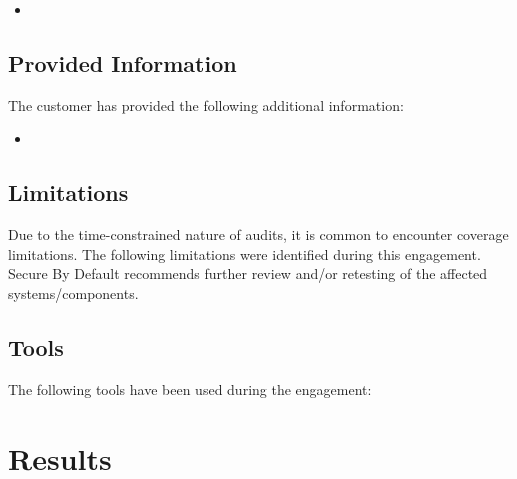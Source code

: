   \begin{itemize}
      \item {}
  \end{itemize}

  \subsection{Provided Information}

  The customer has provided the following additional information:

  \begin{itemize}
      \item {}
  \end{itemize}

  \subsection{Limitations}

  Due to the time-constrained nature of audits, it is common to encounter coverage limitations.
  The following limitations were identified during this engagement.
  Secure By Default recommends further review and/or retesting of the affected systems/components.


\subsection{Tools}

The following tools have been used during the engagement:


\clearpage

\section{Results}
\label{sec:results}




